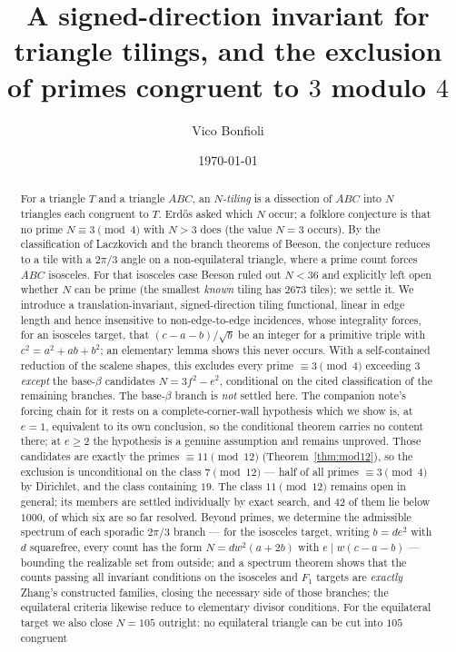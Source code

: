\documentclass[11pt,reqno]{amsart}
\title[A signed-direction invariant for triangle tilings]{A signed-direction invariant for triangle tilings, and the exclusion of primes congruent to $3$ modulo $4$}
\author{Vico Bonfioli}
\date{\today}
\theoremstyle{plain}
\theoremstyle{definition}
\begin{document}
\begin{abstract}
For a triangle $T$ and a triangle $ABC$, an \emph{$N$-tiling} is a dissection of $ABC$ into $N$
triangles each congruent to $T$. Erd\H{o}s asked which $N$ occur; a folklore conjecture is that no
prime $N\equiv 3\pmod 4$ with $N>3$ does (the value $N=3$ occurs). By the classification of
Laczkovich and the branch theorems of Beeson, the conjecture reduces to a tile with a $2\pi/3$ angle
on a non-equilateral triangle, where a prime count forces $ABC$ isosceles. For that isosceles case
Beeson ruled out $N<36$ and explicitly left open whether $N$ can be prime (the smallest \emph{known}
tiling has $2673$ tiles); we settle it. We introduce a translation-invariant, signed-direction
tiling functional, linear in edge length and hence insensitive to non-edge-to-edge incidences, whose
integrality forces, for an isosceles target, that $(c-a-b)/\sqrt b$ be an integer for a primitive
triple with $c^2=a^2+ab+b^2$; an elementary lemma shows this never occurs. With a self-contained
reduction of the scalene shapes, this excludes every prime $\equiv 3\pmod 4$ exceeding $3$
\emph{except} the base-$\beta$ candidates $N=3f^2-e^2$, conditional on the cited classification of
the remaining branches. The base-$\beta$ branch is \emph{not} settled here. The companion note's
forcing chain for it rests on a complete-corner-wall hypothesis which we show is, at $e=1$,
equivalent to its own conclusion, so the conditional theorem carries no content there; at $e\ge2$
the hypothesis is a genuine assumption and remains unproved. Those candidates are exactly the primes $\equiv11\pmod{12}$
(Theorem~\ref{thm:mod12}), so the exclusion is unconditional on the class $7\pmod{12}$ --- half of
all primes $\equiv3\pmod4$ by Dirichlet, and the class containing $19$. The class $11\pmod{12}$
remains open in general; its members are settled individually by exact search, and $42$ of them lie
below $1000$, of which six are so far resolved. Beyond primes, we determine the admissible spectrum of each sporadic $2\pi/3$
branch --- for the isosceles target, writing $b=de^2$ with $d$ squarefree, every count has the form
$N=dw^2(a+2b)$ with $e\mid w(c-a-b)$ --- bounding the realizable set from outside; and a
spectrum theorem shows that the counts passing all invariant conditions on the isosceles and
$F_1$ targets are \emph{exactly} Zhang's constructed families, closing the necessary side of
those branches; the equilateral criteria likewise reduce to elementary divisor conditions. For the equilateral
target we also close $N=105$ outright: no equilateral triangle can be cut into $105$ congruent

\end{abstract}
\end{document}
